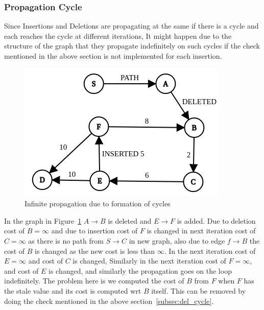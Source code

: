 \documentclass[a4paper]{article}
\begin{document}
\subsubsection{Propagation Cycle}\label{subsec:propagation_cycle}
Since Insertions and Deletions are propagating at the same if there is a cycle and each reaches the cycle at different iterations, It might happen due to the structure of the graph that they propagate indefinitely on such cycles if the check mentioned in the above section is not implemented for each insertion.
\begin{figure}[H]
    \centering
    \includegraphics[scale=0.45]{img/prop_cycle.png}
    \caption{Infinite propagation due to formation of cycles}
    \label{fig:propogation_cycle}
\end{figure}

In the graph in Figure~\ref{fig:propogation_cycle} $A \rightarrow B$ is deleted and $E \rightarrow F$ is added. Due to deletion cost of $B = \infty$  and due to insertion cost of $F$ is changed in next iteration cost of $C = \infty$ as there is no path from $S \rightarrow C$ in new graph, also due to edge $f \rightarrow B$ the cost of $B$ is changed as the new cost is less than $\infty$. In the next iteration cost of $E = \infty$ and cost of $C$ is changed, Similarly in the next iteration cost of $F = \infty$, and cost of $E$ is changed, and similarly the propagation goes on the loop indefinitely. The problem here is we computed the cost of $B$ from $F$ when $F$ has the stale value and its cost is computed wrt $B$ itself. This can be removed by doing the check mentioned in the above section~\ref{subsec:del_cycle}.
\end{document}
